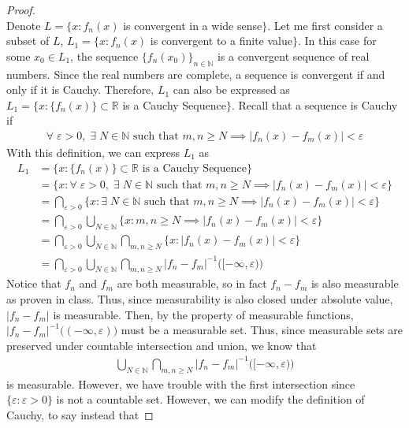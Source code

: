 \documentclass[10pt,a4paper]{article}
\theoremstyle{definition}
\theoremstyle{definition}
\numberwithin{equation}{section}
\begin{document}
\begin{proof}$ $
\\Denote $L = \{x : f_n(x)$ is convergent in a wide sense$\}$. Let me first consider a subset of $L$, $L_1 = \{x : f_n(x)$ is convergent to a finite value$\}$. In this case for some $x_0 \in L_1$, the sequence $\{f_n(x_0)\}_{n \in \mathbb{N}}$ is a convergent sequence of real numbers. Since the real numbers are complete, a sequence is convergent if and only if it is Cauchy. Therefore, $L_1$ can also be expressed as $L_1 = \{x : \{f_n(x)\} \subset \mathbb{R}$ is a Cauchy Sequence$\}$. Recall that a sequence is Cauchy if 
\begin{align*}
\forall \; \varepsilon > 0, \; \exists \; N \in \mathbb{N} \text{ such that } m, n \geq N \implies |f_n(x) - f_m(x)| < \varepsilon
\end{align*}
With this definition, we can express $L_1$ as 
\begin{align*}
L_1 &= \{x : \{f_n(x)\} \subset \mathbb{R} \text{ is a Cauchy Sequence}\}\\
&= \{x : \forall \; \varepsilon > 0, \; \exists \; N \in \mathbb{N} \text{ such that } m, n \geq N \implies |f_n(x) - f_m(x)| < \varepsilon \}\\
&= \bigcap_{\varepsilon > 0} \{x : \exists \; N \in \mathbb{N} \text{ such that } m, n \geq N \implies |f_n(x) - f_m(x)| < \varepsilon \}\\
&= \bigcap_{\varepsilon > 0} \bigcup_{N \in \mathbb{N}} \{x : m, n \geq N \implies |f_n(x) - f_m(x)| < \varepsilon \}\\
&= \bigcap_{\varepsilon > 0} \bigcup_{N \in \mathbb{N}} \bigcap_{m, n \geq N} \{x : |f_n(x) - f_m(x)| < \varepsilon \}\\
&= \bigcap_{\varepsilon > 0} \bigcup_{N \in \mathbb{N}} \bigcap_{m, n \geq N} |f_n - f_m|^{-1}\big([-\infty, \varepsilon) \big)
\end{align*}
Notice that $f_n$ and $f_m$ are both measurable, so in fact $f_n - f_m$ is also measurable as proven in class. Thus, since measurability is also closed under absolute value, $|f_n - f_m|$ is measurable. Then, by the property of measurable functions, $|f_n - f_m|^{-1}\big((-\infty, \varepsilon)\big)$ must be a measurable set. Thus, since measurable sets are preserved under countable intersection and union, we know that 
\begin{align*}
\bigcup_{N \in \mathbb{N}} \bigcap_{m, n \geq N} |f_n - f_m|^{-1}\big([-\infty, \varepsilon) \big)
\end{align*}
is measurable. However, we have trouble with the first intersection since $\{\varepsilon : \varepsilon > 0\}$ is not a countable set. However, we can modify the definition of Cauchy, to say instead that 

\end{proof}
\end{document}
